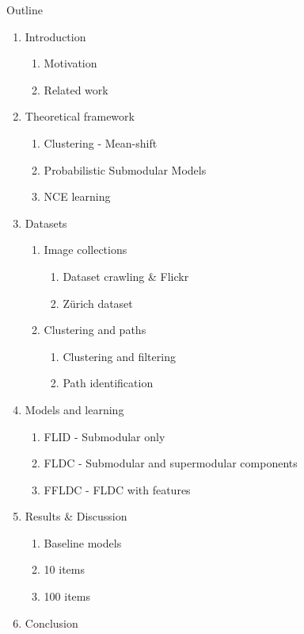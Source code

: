 \documentclass{beamer}
\begin{document}
\begin{frame}[allowframebreaks]{Outline}
  \begin{enumerate}
    \item Introduction
      \begin{enumerate}
        \item Motivation
        \item Related work
      \end{enumerate}
    \item Theoretical framework
      \begin{enumerate}
        \item Clustering - Mean-shift
        \item Probabilistic Submodular Models
        \item NCE learning
      \end{enumerate}
    \item Datasets
      \begin{enumerate}
        \item Image collections
          \begin{enumerate}
            \item Dataset crawling \& Flickr
            \item Zürich dataset
          \end{enumerate}
        \item Clustering and paths
          \begin{enumerate}
            \item Clustering and filtering
            \item Path identification
          \end{enumerate}
       \end{enumerate}
    \item Models and learning
      \begin{enumerate}
        \item FLID - Submodular only
        \item FLDC - Submodular and supermodular components
        \item FFLDC - FLDC with features
      \end{enumerate}
    \item Results \& Discussion
      \begin{enumerate}
        \item Baseline models
        \item 10 items
        \item 100 items
      \end{enumerate}
    \item Conclusion
  \end{enumerate}
\end{frame}
%  
%  
\end{document}
